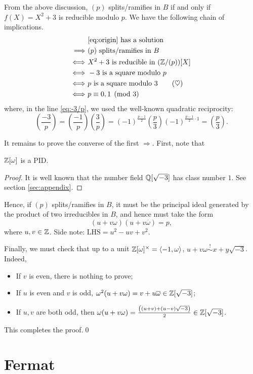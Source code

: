 \documentclass{article}
\newcommand{\m}{\sqrt{-3}}
\newcommand{\leg}[2]{\genfrac{(}{)}{}{}{#1}{#2}}
\begin{document}
From the above discussion, $(p)$ splits/ramifies in $B$ if and only if $f(X)=X^2+3$ is reducible modulo $p$. We have the following chain of implications.
\begin{align}
    & \text{\eqref{eq:origin} has a solution} \nonumber \\
    \Longrightarrow\ & (p) \text{ splits/ramifies in }B \nonumber \\
    \Longleftrightarrow\ & X^2+3 \text{ is reducible in }(\mathbb{Z}/(p))[X] \nonumber \\
    \Longleftrightarrow\ & -3 \text{ is a square modulo } p \nonumber \\
    \Longleftrightarrow\ & p \text{ is a square modulo } 3 \tag{$\heartsuit$} \label{eq:-3/p} \\
    \Longleftrightarrow\ & p \equiv 0,1 \pmod{3} \nonumber
\end{align}
where, in the line \eqref{eq:-3/p}, we used the well-known quadratic reciprocity:
\[
    \leg{-3}{p}=\leg{-1}{p}\leg{3}{p}=(-1)^{\frac{p-1}{2}}\leg{p}{3}(-1)^{\frac{p-1}{2}\cdot 1}=\leg{p}{3}.
\]

It remains to prove the converse of the first $\Longrightarrow$. First, note that
\begin{lemma}
    $\mathbb{Z}[\omega]$ is a PID.
\end{lemma}
\begin{proof}
    It is well known that the number field $\Q[\m]$ has class number $1$. See section \ref{sec:appendix}.
\end{proof}

Hence, if $(p)$ splits/ramifies in $B$, it must be the principal ideal generated by the product of two irreducibles in $B$, and hence must take the form
\[
    (u+v\omega)(u+v\overline{\omega}) = p,
\]
where $u,v\in\mathbb{Z}$. Side note: $\text{LHS}=u^2-uv+v^2$.

Finally, we must check that up to a unit $\mathbb{Z}[\omega]^\times=\left\langle-1,\omega\right\rangle$, $u+v\omega\overset{!}{\sim}x+y\m$. Indeed,
\begin{itemize}
    \item If $v$ is even, there is nothing to prove;
    \item If $u$ is even and $v$ is odd, $\omega^2(u+v\omega)=v+u\overline{\omega}\in\Z[\m]$;
    \item If $u,v$ are both odd, then $\omega(u+v\omega)=\frac{\bp{(u+v)+(u-v)\m}}{2}\in\Z[\m]$.
\end{itemize}
This completes the proof.\qed

\section{Fermat}
\end{document}
